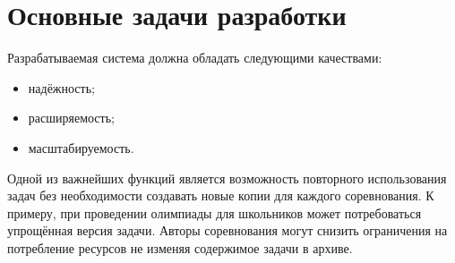 \section{Основные задачи разработки}
Разрабатываемая система должна обладать следующими качествами:
\begin{itemize}
    \item надёжность;
    \item расширяемость;
    \item масштабируемость.
\end{itemize}

Одной из важнейших функций является возможность повторного
использования задач без необходимости создавать
новые копии для каждого соревнования. К примеру,
при проведении олимпиады для школьников
может потребоваться упрощённая версия задачи.
Авторы соревнования могут снизить ограничения на потребление
ресурсов не изменяя содержимое задачи в архиве.
